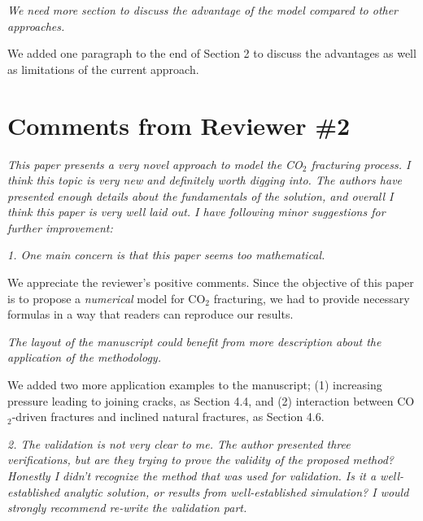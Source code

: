\documentclass{elsarticle}
\newcommand{\review}[1]{ \textit{#1}}
\begin{document}
{\bigskip
    \review{We need more section to discuss the advantage of the model compared to other approaches.}

{We added one paragraph to the end of Section 2 to discuss the advantages as well as limitations of the current approach. %
}


\section*{Comments from Reviewer \#2}
    \review{This paper presents a very novel approach to model the CO$_2$ fracturing process. I think this topic is very new and definitely worth digging into. The authors have presented enough details about the fundamentals of the solution, and overall I think this paper is very well laid out. I have following minor suggestions for further improvement:}

    \review{1. One main concern is that this paper seems too mathematical. }

% 
{We appreciate the reviewer's positive comments. Since the objective of this paper is to propose a \emph{numerical} model for CO$_2$ fracturing, we had to provide necessary formulas in a way that readers can reproduce our results. }

\bigskip

\review{The layout of the manuscript could benefit from more description about the application of the methodology.}

We added two more application examples to the manuscript; (1) increasing pressure leading to joining cracks, as Section 4.4, and (2) interaction between CO$_2$-driven fractures and inclined natural fractures, as Section 4.6.

\bigskip

    \review{2. The validation is not very clear to me. The author presented three verifications, but are they trying to prove the validity of the proposed method? Honestly I didn't recognize the method that was used for validation. Is it a well-established analytic solution, or results from well-established simulation? I would strongly recommend re-write the validation part.}

}
\end{document}
